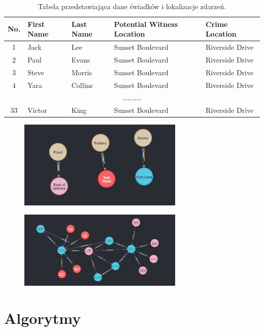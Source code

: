\documentclass[a4paper,12pt]{article}
\begin{document}
\begin{table}[h!]
\centering
\begin{tabular}{|c|l|l|l|l|}
\hline
\textbf{No.} & \textbf{First Name} & \textbf{Last Name} & \textbf{Potential Witness Location} & \textbf{Crime Location} \\ \hline
1            & Jack                & Lee                & Sunset Boulevard                   & Riverside Drive          \\ \hline
2            & Paul                & Evans              & Sunset Boulevard                   & Riverside Drive          \\ \hline
3            & Steve               & Morris             & Sunset Boulevard                   & Riverside Drive          \\ \hline
4            & Yara                & Collins            & Sunset Boulevard                   & Riverside Drive          \\ \hline
\multicolumn{5}{|c|}{\dots\dots\dots\dots} \\ \hline
33           & Victor              & King               & Sunset Boulevard                   & Riverside Drive          \\ \hline
\end{tabular}
\caption{Tabela przedstawiająca dane świadków i lokalizacje zdarzeń.}
\label{tab:witness_data}
\end{table}

\begin{figure}[h!]
    \centering
    \includegraphics[width=0.7\textwidth]{commited_at.png}
\end{figure}

\begin{figure}[h!]
    \centering
    \includegraphics[width=0.7\textwidth]{located_at.png}
\end{figure}

\section{Algorytmy}
\end{document}
